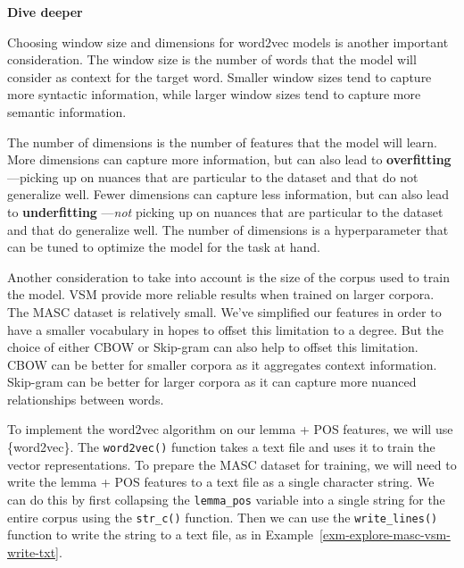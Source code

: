 \documentclass[
  letterpaper,
  krantz1]{latex/krantz-mod}
\theoremstyle{definition}
\theoremstyle{definition}
\theoremstyle{remark}
\begin{document}
\begin{tcolorbox}[enhanced jigsaw, toprule=.15mm, breakable, colback=white, arc=.35mm, left=2mm, colframe=quarto-callout-color-frame, opacityback=0, bottomrule=.15mm, rightrule=.15mm, leftrule=.75mm]

\textbf{ Dive deeper}

Choosing window size and dimensions for word2vec models
is another important consideration. The window size is the number of
words that the model will consider as context for the target word.
Smaller window sizes tend to capture more syntactic information, while
larger window sizes tend to capture more semantic information.

The number of dimensions is the number of features that the model will
learn. More dimensions can capture more information, but can also lead
to \textbf{overfitting} ---picking up on nuances that
are particular to the dataset and that do not generalize well. Fewer
dimensions can capture less information, but can also lead to
\textbf{underfitting} ---\emph{not} picking up on
nuances that are particular to the dataset and that do generalize well.
The number of dimensions is a hyperparameter that can be tuned to
optimize the model for the task at hand.

\end{tcolorbox}

Another consideration to take into account is the size of the corpus
used to train the model. VSM provide more reliable results when trained
on larger corpora. The MASC dataset is relatively small. We've
simplified our features in order to have a smaller vocabulary in hopes
to offset this limitation to a degree. But the choice of either CBOW or
Skip-gram can also help to offset this limitation. CBOW can be better
for smaller corpora as it aggregates context information. Skip-gram can
be better for larger corpora as it can capture more nuanced
relationships between words.

To implement the word2vec algorithm on our lemma + POS features, we will
use \{word2vec\}. The \texttt{word2vec()} function takes a text file and
uses it to train the vector representations. To prepare the MASC dataset
for training, we will need to write the lemma + POS features to a text
file as a single character string. We can do this by first collapsing
the \texttt{lemma\_pos} variable into a single string for the entire
corpus using the \texttt{str\_c()} function. Then we can use the
\texttt{write\_lines()} function to write the string to a text file, as
in Example~\ref{exm-explore-masc-vsm-write-txt}.
\end{document}

